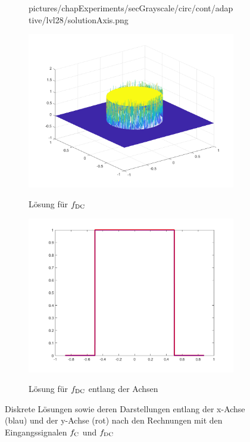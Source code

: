 \begin{figure}[p]
\begin{subfigure}[b]{.48\linewidth}
      {pictures/chapExperiments/secGrayscale/circ/cont/adaptive/lvl28/solutionAxis.png}
    \label{fig:circContSolAxis}
  \end{subfigure}

  \begin{subfigure}[b]{.48\linewidth}
    \centering
    \caption{Lösung für $f_\textup{DC}$}
    \includegraphics[trim = 40 30 30 30, clip, width=\linewidth]
      {pictures/chapExperiments/secGrayscale/circ/disc/adaptive/lvl26/solution.png}
    \label{fig:circDiscSol}
  \end{subfigure}
  \quad
  \begin{subfigure}[b]{.48\linewidth}
    \centering
    \caption{Lösung für $f_\textup{DC}$ entlang der Achsen}
    \includegraphics[trim = 50 30 50 20, clip, width=\linewidth]
      {pictures/chapExperiments/secGrayscale/circ/disc/adaptive/lvl26/solutionAxis.png}
    \label{fig:circDiscSolAxis}
  \end{subfigure}
  \caption{Diskrete Lösungen sowie deren Darstellungen entlang der x-Achse
    (blau) und der y-Achse (rot) nach den Rechnungen mit den Eingangssignalen
    $f_\textup{C}$ und $f_\textup{DC}$}
  \label{fig:circleSol}
\end{figure}
